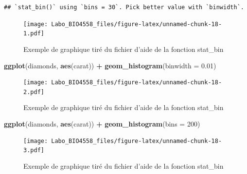 \documentclass[12pt,]{book}
\newenvironment{Shaded}{\begin{snugshade}}{\end{snugshade}}
\newcommand{\DataTypeTok}[1]{\textcolor[rgb]{0.27,0.27,0.27}{#1}}
\newcommand{\DecValTok}[1]{\textcolor[rgb]{0.06,0.06,0.06}{#1}}
\newcommand{\FloatTok}[1]{\textcolor[rgb]{0.06,0.06,0.06}{#1}}
\newcommand{\KeywordTok}[1]{\textcolor[rgb]{0.27,0.27,0.27}{\textbf{#1}}}
\newcommand{\NormalTok}[1]{#1}
\newcommand{\OperatorTok}[1]{\textcolor[rgb]{0.43,0.43,0.43}{\textbf{#1}}}
\newcommand{\StringTok}[1]{\textcolor[rgb]{0.5,0.5,0.5}{#1}}
\begin{document}
\begin{verbatim}
## `stat_bin()` using `bins = 30`. Pick better value with `binwidth`.
\end{verbatim}

\begin{figure}
\centering
\texttt{[image: Labo\_BIO4558\_files/figure-latex/unnamed-chunk-18-1.pdf]}
\caption{\label{fig:unnamed-chunk-18-1}Exemple de graphique tiré du fichier d'aide de la fonction stat\_bin}
\end{figure}

\begin{Shaded}
\begin{Highlighting}[]
\KeywordTok{ggplot}\NormalTok{(diamonds, }\KeywordTok{aes}\NormalTok{(carat)) }\OperatorTok{+}
\StringTok{  }\KeywordTok{geom_histogram}\NormalTok{(}\DataTypeTok{binwidth =} \FloatTok{0.01}\NormalTok{)}
\end{Highlighting}
\end{Shaded}

\begin{figure}
\centering
\texttt{[image: Labo\_BIO4558\_files/figure-latex/unnamed-chunk-18-2.pdf]}
\caption{\label{fig:unnamed-chunk-18-2}Exemple de graphique tiré du fichier d'aide de la fonction stat\_bin}
\end{figure}

\begin{Shaded}
\begin{Highlighting}[]
\KeywordTok{ggplot}\NormalTok{(diamonds, }\KeywordTok{aes}\NormalTok{(carat)) }\OperatorTok{+}
\StringTok{  }\KeywordTok{geom_histogram}\NormalTok{(}\DataTypeTok{bins =} \DecValTok{200}\NormalTok{)}
\end{Highlighting}
\end{Shaded}

\begin{figure}
\centering
\texttt{[image: Labo\_BIO4558\_files/figure-latex/unnamed-chunk-18-3.pdf]}
\caption{\label{fig:unnamed-chunk-18-3}Exemple de graphique tiré du fichier d'aide de la fonction stat\_bin}
\end{figure}

\printindex
\end{document}
